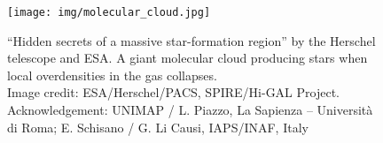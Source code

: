 \begin{figure}
  \centering
  \texttt{[image: img/molecular\_cloud.jpg]}
  \caption[Hidden secrets of a massive star-formation region]{
    \label{img:molecular-cloud}
    ``Hidden secrets of a massive star-formation region'' by the Herschel telescope and ESA.
    A giant molecular cloud producing stars when local overdensities in the gas collapses. \\
    Image credit: ESA/Herschel/PACS, SPIRE/Hi-GAL Project. Acknowledgement: UNIMAP / L. Piazzo, La Sapienza – Università di Roma; E. Schisano / G. Li Causi, IAPS/INAF, Italy
  }
\end{figure}

